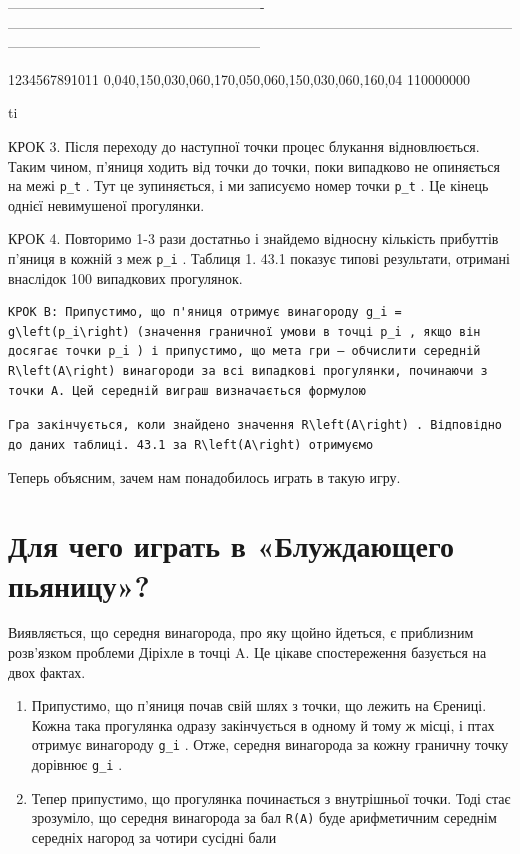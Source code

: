 \documentclass[
  ukrainian,
]{article}
\begin{document}
\textbar-------------------------------------------------------\textbar---------------------------------------------------------------------------------------------------\textbar------------------------------------------------------------\textbar--\textbar--\textbar{}

1234567891011 \textbar{}
0,040,150,030,060,170,050,060,150,030,060,160,04 \textbar{} 110000000
\textbar{} \textbar{} \textbar{}

ti

КРОК 3. Після переходу до наступної точки процес блукання відновлюється.
Таким чином, п'яниця ходить від точки до точки, поки випадково не
опиняється на межі \texttt{p\_t} . Тут це зупиняється, і ми записуємо
номер точки \texttt{p\_t} . Це кінець однієї невимушеної прогулянки.

КРОК 4. Повторимо 1-3 рази достатньо і знайдемо відносну кількість
прибуттів п'яниця в кожній з меж \texttt{p\_i} . Таблиця 1. 43.1 показує
типові результати, отримані внаслідок 100 випадкових прогулянок.

\begin{verbatim}
КРОК B: Припустимо, що п'яниця отримує винагороду g_i = g\left(p_i\right) (значення граничної умови в точці p_i , якщо він досягає точки p_i ) і припустимо, що мета гри — обчислити середній R\left(A\right) винагороди за всі випадкові прогулянки, починаючи з точки A. Цей середній виграш визначається формулою
\end{verbatim}

\texttt{Гра\ закінчується,\ коли\ знайдено\ значення\ \textquotesingle{}R\textbackslash{}left(A\textbackslash{}right)\textquotesingle{}\ .\ Відповідно\ до\ даних\ таблиці.\ 43.1\ за\ \textquotesingle{}R\textbackslash{}left(A\textbackslash{}right)\textquotesingle{}\ отримуємо}

Теперь объясним, зачем нам понадобилось играть в такую игру.

\section{Для чего играть в «Блуждающего
пьяницу»?}\label{ux434ux43bux44f-ux447ux435ux433ux43e-ux438ux433ux440ux430ux442ux44c-ux432-ux431ux43bux443ux436ux434ux430ux44eux449ux435ux433ux43e-ux43fux44cux44fux43dux438ux446ux443}

Виявляється, що середня винагорода, про яку щойно йдеться, є приблизним
розв'язком проблеми Діріхле в точці A. Це цікаве спостереження базується
на двох фактах.

\begin{enumerate}
\def\labelenumi{\arabic{enumi}.}
\item
  Припустимо, що п'яниця почав свій шлях з точки, що лежить на Єрениці.
  Кожна така прогулянка одразу закінчується в одному й тому ж місці, і
  птах отримує винагороду \texttt{g\_i} . Отже, середня винагорода за
  кожну граничну точку дорівнює \texttt{g\_i} .
\item
  Тепер припустимо, що прогулянка починається з внутрішньої точки. Тоді
  стає зрозуміло, що середня винагорода за бал \texttt{R(A)} буде
  арифметичним середнім середніх нагород за чотири сусідні бали
\end{enumerate}
\end{document}
